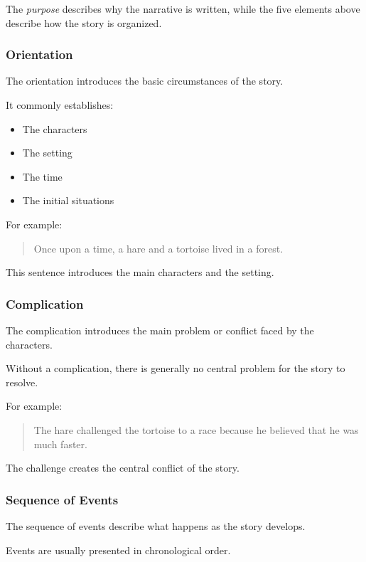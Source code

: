 The \textit{purpose} describes why the narrative is written, while the five elements above describe how the story is organized.

\subsubsection{Orientation}

The orientation introduces the basic circumstances of the story.


It commonly establishes:

\begin{itemize}
\item The characters
\item The setting
\item The time
\item The initial situations
\end{itemize}

For example:


\begin{quotation}
  Once upon a time, a hare and a tortoise lived in a forest.
\end{quotation}

This sentence introduces the main characters and the setting.

\subsubsection{Complication}

The complication introduces the main problem or conflict faced by the characters.


Without a complication, there is generally no central problem for the story to resolve.


For example:

\begin{quotation}
  The hare challenged the tortoise to a race because he believed that he was much faster.
\end{quotation}


The challenge creates the central conflict of the story.


\subsubsection{Sequence of Events}

The sequence of events describe what happens as the story develops.


Events are usually presented in chronological order.



